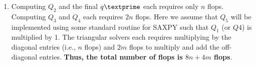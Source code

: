 \begin{enumerate}
\item Computing $Q_{2}$ and the final $q\textprime$ each requires only $n$ flops. Computing $Q_{3}$ and $Q_{4}$ each requires $2n$ flops. Here we assume that $Q_{5}$ will be implemented using some standard routine for SAXPY such that $Q_{1}$ (or $Q{4}$) is multiplied by 1. The triangular solvers each requires multiplying by the diagonal entries (i.e., $n$ flops) and $2m$ flops to multiply and add the off-diagonal entries. \textbf{Thus, the total number of flops is $8n + 4m$ flops}.


\end{enumerate}